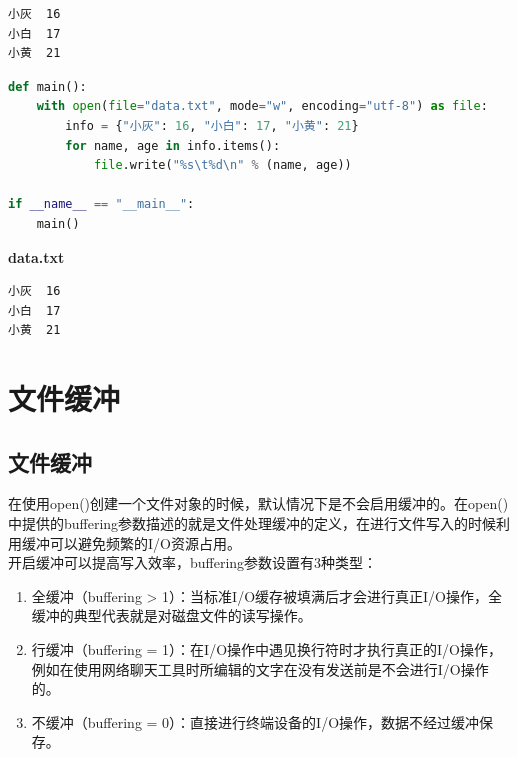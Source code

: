 \begin{tcolorbox}
	\begin{verbatim}
小灰	16
小白	17
小黄	21
	\end{verbatim}
\end{tcolorbox}

\vspace{0.5cm}


\begin{lstlisting}[language=Python]
def main():
    with open(file="data.txt", mode="w", encoding="utf-8") as file:
        info = {"小灰": 16, "小白": 17, "小黄": 21}
        for name, age in info.items():
            file.write("%s\t%d\n" % (name, age))

if __name__ == "__main__":
    main()
\end{lstlisting}

\begin{tcolorbox}
	\textbf{data.txt}
	\begin{verbatim}
小灰	16
小白	17
小黄	21
	\end{verbatim}
\end{tcolorbox}

\newpage

\section{文件缓冲}

\subsection{文件缓冲}

在使用open()创建一个文件对象的时候，默认情况下是不会启用缓冲的。在open()中提供的buffering参数描述的就是文件处理缓冲的定义，在进行文件写入的时候利用缓冲可以避免频繁的I/O资源占用。 \\

开启缓冲可以提高写入效率，buffering参数设置有3种类型：

\begin{enumerate}
	\item 全缓冲（buffering > 1）：当标准I/O缓存被填满后才会进行真正I/O操作，全缓冲的典型代表就是对磁盘文件的读写操作。

	\item 行缓冲（buffering = 1）：在I/O操作中遇见换行符时才执行真正的I/O操作，例如在使用网络聊天工具时所编辑的文字在没有发送前是不会进行I/O操作的。

	\item 不缓冲（buffering = 0）：直接进行终端设备的I/O操作，数据不经过缓冲保存。
\end{enumerate}

